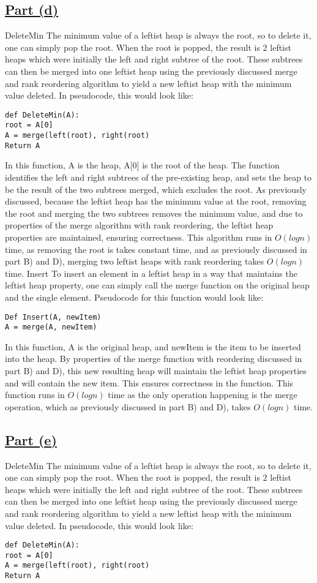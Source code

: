 \documentclass{article}
\begin{document}
\subsection*{\underline{Part (d)}}
DeleteMin
The minimum value of a leftist heap is always the root, so to delete it, one can simply pop the root. When the root is popped, the result is 2 leftist heaps which were initially the left and right subtree of the root. These subtrees can then be merged into one leftist heap using the previously discussed merge and rank reordering algorithm to yield a new leftist heap with the minimum value deleted. In pseudocode, this would look like:
\begin{lstlisting}
def DeleteMin(A):
root = A[0]
A = merge(left(root), right(root)
Return A
\end{lstlisting}
In this function, A is the heap, A[0] is the root of the heap.
The function identifies the left and right subtrees of the pre-existing heap, and sets the heap to be the result of the two subtrees merged, which excludes the root. As previously discussed, because the leftist heap has the minimum value at the root, removing the root and merging the two subtrees removes the minimum value, and due to properties of the merge algorithm with rank reordering, the leftist heap properties are maintained, ensuring correctness.
This algorithm runs in $O(logn)$ time, as removing the root is takes constant time, and as previously discussed in part B) and D), merging two leftist heaps with rank reordering takes $O(logn)$ time.
Insert
To insert an element in a leftist heap in a way that maintains the leftist heap property, one can simply call the merge function on the original heap and the single element. Pseudocode for this function would look like:
\begin{lstlisting}
Def Insert(A, newItem)
A = merge(A, newItem)
\end{lstlisting}
In this function, A is the original heap, and newItem is the item to be inserted into the heap.
By properties of the merge function with reordering discussed in part B) and D), this new resulting heap will maintain the leftist heap properties and will contain the new item. This ensures correctness in the function.
This function runs in $O(logn)$ time as the only operation happening is the merge operation, which as previously discussed in part B) and D), takes $O(logn)$ time.

\subsection*{\underline{Part (e)}}
DeleteMin
The minimum value of a leftist heap is always the root, so to delete it, one can simply pop the root. When the root is popped, the result is 2 leftist heaps which were initially the left and right subtree of the root. These subtrees can then be merged into one leftist heap using the previously discussed merge and rank reordering algorithm to yield a new leftist heap with the minimum value deleted. In pseudocode, this would look like:
\begin{lstlisting}
def DeleteMin(A):
root = A[0]
A = merge(left(root), right(root)
Return A
\end{lstlisting}
\end{document}
